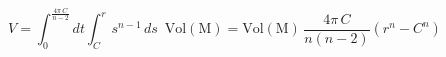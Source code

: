 \begin{equation}
V=\int_{0}^{\frac{4\pi \,C}{n-2}} dt \int_{C}^{r}s^{n-1}\, ds  \,\,\,\mathrm{Vol(M)}=\mathrm{Vol(M)}\,\frac{4\pi \,C}{n(n-2)}\left(r^n-C^n\right)
\end{equation}

